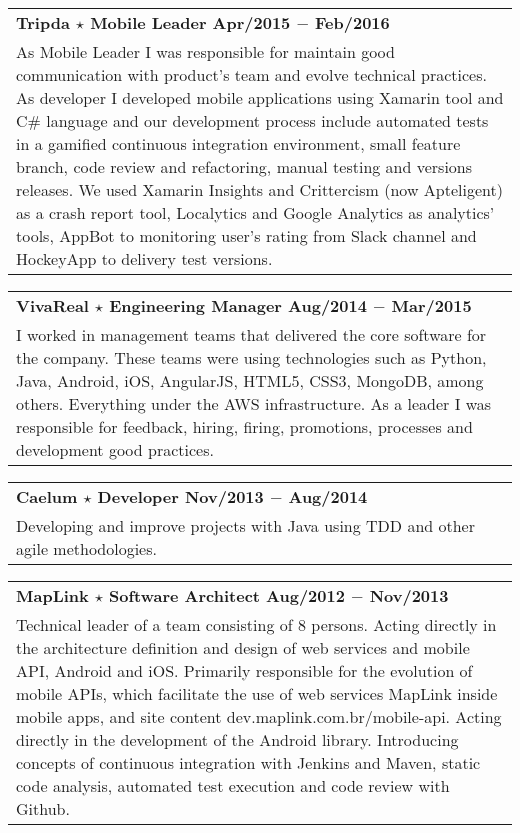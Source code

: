 \documentclass[a4paper, oneside, final]{scrartcl}
\newcommand{\vspc}{\vspace{0.15cm}} %
\begin{document}
\begin{center}
\begin{tabularx}{1\linewidth}{X}
{\bf Tripda $\star$ Mobile Leader \hfill Apr/2015 $-$ Feb/2016} \\
As Mobile Leader I was responsible for maintain good communication with product's team and evolve technical practices. As developer I developed mobile applications using Xamarin tool and C\# language and our development process include automated tests in a gamified continuous integration environment, small feature branch, code review and refactoring, manual testing and versions releases. We used Xamarin Insights and Crittercism (now Apteligent) as a crash report tool, Localytics and Google Analytics as analytics' tools, AppBot to monitoring user's rating from Slack channel and HockeyApp to delivery test versions. \vspc\\
\end{tabularx}

\begin{tabularx}{1\linewidth}{X}
{\bf VivaReal $\star$ Engineering Manager \hfill Aug/2014 $-$ Mar/2015} \\
I worked in management teams that delivered the core software for the company. These teams were using technologies such as Python, Java, Android, iOS, AngularJS, HTML5, CSS3, MongoDB, among others. Everything under the AWS infrastructure. As a leader I was responsible for feedback, hiring, firing, promotions, processes and development good practices. \vspc\\
\end{tabularx}

\begin{tabularx}{1\linewidth}{X}
{\bf Caelum $\star$ Developer \hfill Nov/2013 $-$ Aug/2014} \\
Developing and improve projects with Java using TDD and other agile methodologies. \vspc\\
\end{tabularx}

\begin{tabularx}{1\linewidth}{X}
{\bf MapLink $\star$ Software Architect \hfill Aug/2012 $-$ Nov/2013} \\
Technical leader of a team consisting of 8 persons. Acting directly in the architecture definition and design of web services and mobile API, Android and iOS. Primarily responsible for the evolution of mobile APIs, which facilitate the use of web services MapLink inside mobile apps, and site content dev.maplink.com.br/mobile-api. Acting directly in the development of the Android library. Introducing concepts of continuous integration with Jenkins and Maven, static code analysis, automated test execution and code review with Github. \vspc\\
\end{tabularx}


\end{center}
\end{document}
